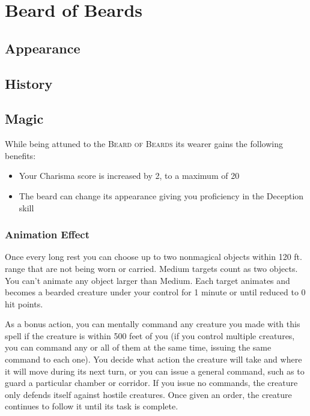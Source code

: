 \ItemSubCategory{}

\chapter*{Beard of Beards}
\section*{Appearance}

\section*{History}

\section*{Magic}
While being attuned to the \textsc{Beard of Beards} its wearer gains the following benefits:
\begin{itemize}
	\item Your Charisma score is increased by 2, to a maximum of 20
	\item The beard can change its appearance giving you proficiency in the Deception skill
\end{itemize}
\subsection*{Animation Effect}
Once every long rest you can choose up to two nonmagical objects within 120 ft. range that are not being worn or carried. Medium targets count as two objects. You can't animate any object larger than Medium. Each target animates and becomes a bearded creature under your control for 1 minute or until reduced to 0 hit points.
	
As a bonus action, you can mentally command any creature you made with this spell if the creature is within 500 feet of you (if you control multiple creatures, you can command any or all of them at the same time, issuing the same command to each one). You decide what action the creature will take and where it will move during its next turn, or you can issue a general command, such as to guard a particular chamber or corridor. If you issue no commands, the creature only defends itself against hostile creatures. Once given an order, the creature continues to follow it until its task is complete.
	
